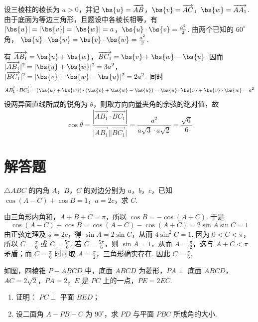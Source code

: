 \begin{solution}
设三棱柱的棱长为 \(a>0\)，并记
\(\bs{u}=\overrightarrow{AB}\)，\(\bs{v}=\overrightarrow{AC}\)，\(\bs{w}=\overrightarrow{AA_{1}}\). 由于底面为等边三角形，且题设中各棱长相等，有
\(\lvert\bs{u}\rvert=\lvert\bs{v}\rvert=\lvert\bs{w}\rvert=a\)，\(\bs{u}\cdot\bs{v}=\frac{a^{2}}{2}\). 由两个已知的 \(60^{\circ}\) 角，
\(\bs{u}\cdot\bs{w}=\bs{v}\cdot\bs{w}=\frac{a^{2}}{2}\).

有
\(\overrightarrow{AB_{1}}=\bs{u}+\bs{w}\)，\(\overrightarrow{BC_{1}}=\bs{v}+\bs{w}-\bs{u}\). 因而
\(\lvert\overrightarrow{AB_{1}}\rvert^{2}=\lvert\bs{u}+\bs{w}\rvert^{2}=3a^{2}\)，\(\lvert\overrightarrow{BC_{1}}\rvert^{2}=\lvert\bs{v}+\bs{w}-\bs{u}\rvert^{2}=2a^{2}\).
同时
\[
\overrightarrow{AB_{1}}\cdot\overrightarrow{BC_{1}}
=(\bs{u}+\bs{w})\cdot(\bs{v}+\bs{w}-\bs{u})
=\bs{u}\cdot\bs{v}+\bs{v}\cdot\bs{w}=a^{2}
\]
设两异面直线所成的锐角为 \(\theta\)，则取方向向量夹角的余弦的绝对值，故
\[
\cos\theta=\frac{\left\lvert\overrightarrow{AB_{1}}\cdot\overrightarrow{BC_{1}}\right\rvert}{\lvert\overrightarrow{AB_{1}}\rvert\lvert\overrightarrow{BC_{1}}\rvert}
 =\frac{a^{2}}{a\sqrt{3}\cdot a\sqrt{2}}=\frac{\sqrt{6}}{6}
\]
\end{solution}

\section{解答题}

\begin{problem}
\(\triangle ABC\) 的内角 \(A\)，\(B\)，\(C\) 的对边分别为 \(a\)，\(b\)，\(c\)，已知 \(\cos (A - C) + \cos B = 1\)，\(a = 2c\)，求 \(C\).
\end{problem}

\begin{solution}
由三角形内角和，\(A+B+C=\pi\)，所以 \(\cos B=-\cos(A+C)\). 于是
\[
\cos(A-C)+\cos B=\cos(A-C)-\cos(A+C)=2\sin A\sin C=1
\]
由正弦定理及 \(a=2c\)，得 \(\sin A=2\sin C\)，从而
\(4\sin^{2}C=1\). 因为 \(0<C<\pi\)，所以 \(C=\frac{\pi}{6}\) 或 \(C=\frac{5\pi}{6}\). 若 \(C=\frac{5\pi}{6}\)，则 \(\sin A=1\)，从而 \(A=\frac{\pi}{2}\)，这与 \(A+C<\pi\) 矛盾；而 \(C=\frac{\pi}{6}\) 时可取 \(A=\frac{\pi}{2}\)，三角形确实存在. 因此 \(C=\frac{\pi}{6}\).
\end{solution}

\begin{problem}
如图，四棱锥 \(P - ABCD\) 中，底面 \(ABCD\) 为菱形，\(PA \perp\) 底面 \(ABCD\)，\(AC = 2\sqrt{2}\)，\(PA = 2\)，\(E\) 是 \(PC\) 上的一点，\(PE = 2EC\).
\begin{enumerate}
\item 证明： \(PC \perp\) 平面 \(BED\)；
\item 设二面角 \(A - PB - C\) 为 \(90^{\circ}\)，求 \(PD\) 与平面 \(PBC\) 所成角的大小.
\end{enumerate}
\end{problem}

